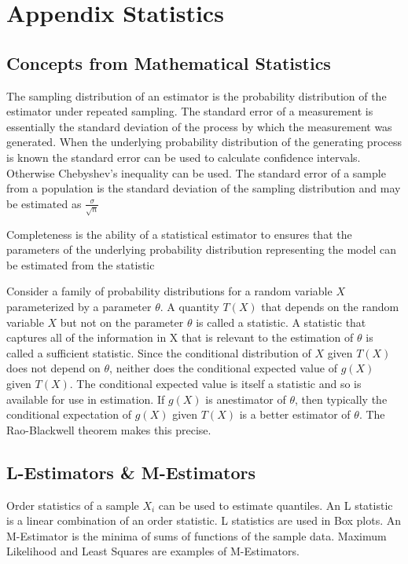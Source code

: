 \chapter{Appendix Statistics}

\section{Concepts from Mathematical Statistics}The sampling distribution of an estimator is the probability distribution of the estimator under repeated sampling.  The standard error of a measurement is essentially the standard deviation of the process by which the measurement was generated.  When the underlying probability distribution of the generating process is known the standard error can be used to calculate confidence intervals.  Otherwise Chebyshev's inequality can be used. The standard error of a sample from a population is the standard deviation of the sampling distribution and may be estimated as $\frac{\sigma}{\sqrt{n}}$

Completeness is the ability of a statistical estimator to ensures that the parameters of the underlying probability distribution representing the model can be estimated from the statistic

Consider a family of probability distributions for a random variable $X$ parameterized by a parameter $\theta$. A quantity $T(X)$ that depends on the random variable $X$ but not on the parameter $\theta$ is called a statistic.  A statistic that captures all of the information in X that is relevant to the estimation of $\theta$ is called a sufficient statistic. Since the conditional distribution of $X$ given $T(X)$ does not depend on $\theta$, neither does the conditional expected value of $g(X)$ given $T(X)$. The conditional expected value is itself a statistic and so is available for use in estimation. If $g(X)$ is anestimator of $\theta$, then typically the conditional expectation of $g(X)$ given $T(X)$ is a better estimator of $\theta$. The Rao-Blackwell theorem makes this precise.


\section{L-Estimators \& M-Estimators}Order statistics of a sample ${X_i}$ can be used to estimate quantiles. An L statistic is a linear combination of an order statistic.  L statistics are used in Box plots.  An M-Estimator is the minima of sums of functions of the sample data.  Maximum Likelihood and Least Squares are examples of M-Estimators.


